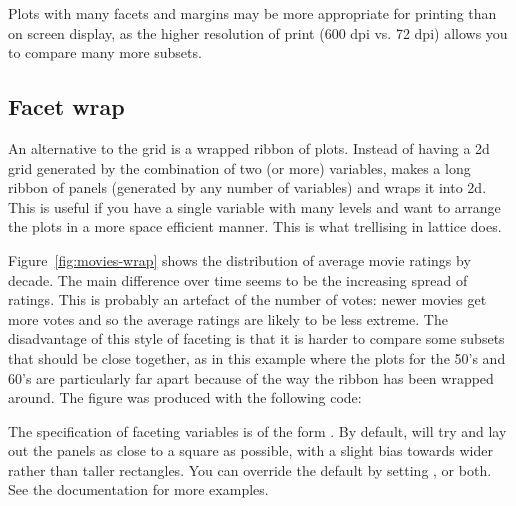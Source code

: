 % 


Plots with many facets and margins may be more appropriate for printing than on screen display, as the higher resolution of print (600 dpi vs. 72 dpi) allows you to compare many more subsets.

\subsection{Facet wrap}
\label{sub:facet_wrap}

An alternative to the grid is a wrapped ribbon of plots.  Instead of having a 2d grid generated by the combination of two (or more) variables,  makes a long ribbon of panels (generated by any number of variables) and wraps it into 2d.  This is useful if you have a single variable with many levels and want to arrange the plots in a more space efficient manner.  This is what trellising in lattice does.

Figure~\ref{fig:movies-wrap} shows the distribution of average movie ratings by decade. The main difference over time seems to be the increasing spread of ratings. This is probably an artefact of the number of votes: newer movies get more votes and so the average ratings are likely to be less extreme. The disadvantage of this style of faceting is that it is harder to compare some subsets that should be close together, as in this example where the plots for the 50's and 60's are particularly far apart because of the way the ribbon has been wrapped around. The figure was produced with the following code:

% 


The specification of faceting variables is of the form . By default,  will try and lay out the panels as close to a square as possible, with a slight bias towards wider rather than taller rectangles. You can override the default by setting ,  or both. See the documentation for more examples.

